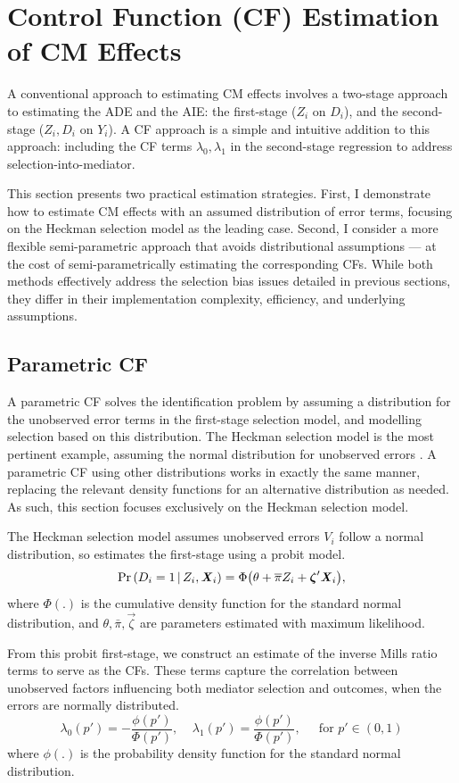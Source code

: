 \section{Control Function (CF) Estimation of CM Effects}
\label{sec:controlfun}
A conventional approach to estimating CM effects involves a two-stage approach to estimating the ADE and the AIE: the first-stage ($Z_i$ on $D_i$), and the second-stage ($Z_i, D_i$ on $Y_i$).
A CF approach is a simple and intuitive addition to this approach: including the CF terms $\lambda_0, \lambda_1$ in the second-stage regression to address selection-into-mediator.

This section presents two practical estimation strategies.
First, I demonstrate how to estimate CM effects with an assumed distribution of error terms, focusing on the Heckman selection model as the leading case.
Second, I consider a more flexible semi-parametric approach that avoids distributional assumptions --- at the cost of semi-parametrically estimating the corresponding CFs.
While both methods effectively address the selection bias issues detailed in previous sections, they differ in their implementation complexity, efficiency, and underlying assumptions.

\subsection{Parametric CF}
A parametric CF solves the identification problem by assuming a distribution for the unobserved error terms in the first-stage selection model, and modelling selection based on this distribution.
The Heckman selection model is the most pertinent example, assuming the normal distribution for unobserved errors \citep{heckman1979sample}.
A parametric CF using other distributions works in exactly the same manner, replacing the relevant density functions for an alternative distribution as needed.
As such, this section focuses exclusively on the Heckman selection model.

The Heckman selection model assumes unobserved errors $V_i$ follow a normal distribution, so estimates the first-stage using a probit model.
\[ \Pr\left( D_i = 1 \, \middle\vert \, Z_i, \boldsymbol{\mathit{X}}_i \right)
    = \Phi \big( \theta + \overline{\pi} Z_i + \boldsymbol{\mathit{\zeta}}' \boldsymbol{\mathit{X}}_i \big), \]
where $\Phi(.)$ is the cumulative density function for the standard normal distribution, and $\theta, \bar\pi, \vec\zeta$ are parameters estimated with maximum likelihood.

From this probit first-stage, we construct an estimate of the inverse Mills ratio terms to serve as the CFs.
These terms capture the correlation between unobserved factors influencing both mediator selection and outcomes, when the errors are normally distributed.
\[ \lambda_0(p') = - \frac{\phi(p')}{\Phi(p')}, \;\;\;\;
\lambda_1(p') = \frac{\phi(p')}{\Phi(p')}, \;\;\;\; \text{ for } p' \in (0,1) \]
where $\phi(.)$ is the probability density function for the standard normal distribution.

